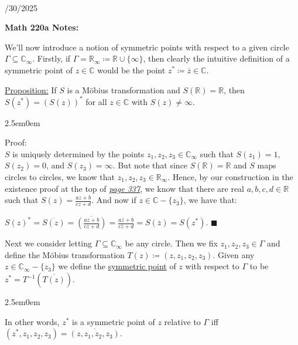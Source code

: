 \documentclass{book}
\newcommand{\inLinkRap}[2]{{\color{blue}\hyperlink{#1}{\textit{#2}}}}
\newcommand{\hTwo}{%
\color{Black}%
   \fontsize{13}{15}\selectfont%
}
\newcommand{\pracTwo}{
   \color{Orange}%
   \fontsize{12}{14}\selectfont%
}
\newcommand{\exTwo}{%
   \color{Purple}%
   \fontsize{13}{15}\selectfont%
}
\newcommand{\exThreeP}{%
   \color{RedViolet}%
   \fontsize{12}{14}\selectfont%
}
\newenvironment{myIndent}{%
   \begin{adjustwidth}{2.5em}{0em}%
}{%
   \end{adjustwidth}%
}
\newcommand{\udefine}[1]{{%
   \setulcolor{Red}%
   \setul{0.14em}{0.07em}%
   \ul{#1}%
}}
\newcommand{\blect}[1]{{\color{MidnightBlue}\textbf{#1}}}
\newcommand{\mySepTwo}[1][.]{%
   {\noindent\color{#1}{\rule{6.5in}{0.5mm}}}\\%
}
\newcommand{\retTwo}{\hfill\bigbreak}
\newcommand{\dispDate}[1]{{
   \color{Black}%
   \fontsize{20}{18}\selectfont%
   #1\retTwo
}}
\begin{document}
\mySepTwo

\dispDate{10/30/2025}

\blect{Math 220a Notes:}\retTwo

We'll now introduce a notion of symmetric points with respect to a given circle $\Gamma \subseteq \mathbb{C}_\infty$. Firstly, if $\Gamma = \mathbb{R}_\infty \coloneqq \mathbb{R} \cup \{\infty\}$, then clearly the intuitive definition of a symmetric point of $z \in \mathbb{C}$ would be the point $z^* \coloneqq \overline{z} \in \mathbb{C}$.\retTwo

\exTwo\ul{Proposition:} If $S$ is a Möbius transformation and $S(\mathbb{R}) = \mathbb{R}$, then $S(z^*) = (S(z))^*$ for all $z \in \mathbb{C}$ with $S(z) \neq \infty$.
\begin{myIndent}\exThreeP
	Proof:\\
	$S$ is uniquely determined by the points $z_1, z_2, z_3 \in \mathbb{C}_\infty$ such that $S(z_1) = 1$, $S(z_2) = 0$, and $S(z_3) = \infty$. But note that since $S(\mathbb{R}) = \mathbb{R}$ and $S$ maps circles to circles, we know that $z_1, z_2, z_3 \in \mathbb{R}_\infty$. Hence, by our construction in the existence proof at the top of \inLinkRap{page 337 reference}{page 337}, we know that there are real $a, b, c, d \in \mathbb{R}$ such that $S(z) = \frac{az + b}{cz + d}$. And now if $z \in \mathbb{C} - \{z_3\}$, we have that:

	{\centering$S(z)^* = \overline{S(z)} =  \overline{\left(\frac{az+ b}{cz + d}\right)} = \frac{a\overline{z}+ b}{c\overline{z} + d} = S(\overline{z}) = S(z^*)$. $\blacksquare$\retTwo\par}
\end{myIndent}

\hTwo Next we consider letting $\Gamma \subseteq \mathbb{C}_\infty$ be any circle. Then we fix $z_1, z_2, z_3 \in \Gamma$ and define the Möbius transformation $T(z) \coloneqq (z, z_1, z_2, z_3)$. Given any $z \in \mathbb{C}_\infty - \{z_3\}$ we define the \udefine{symmetric point} of $z$ with respect to $\Gamma$ to be $z^* = T^{-1}(\overline{T(z)})$.
\begin{myIndent}\pracTwo
	In other words, $z^*$ is a symmetric point of $z$ relative to $\Gamma$ iff $(z^*, z_1, z_2, z_3) = \overline{(z, z_1, z_2, z_3)}$.\retTwo
\end{myIndent}
\end{document}
